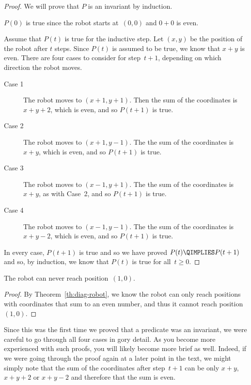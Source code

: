 \begin{proof}
We will prove that $P$ is an invariant by induction.

$P(0)$ is true since the robot starts at~$(0, 0)$ and $0 + 0$ is even.

Assume that $P(t)$ is true for the inductive step.  Let $(x, y)$ be
the position of the robot after $t$ steps.  Since $P(t)$ is assumed to
be true, we know that $x + y$ is even.  There are four cases to
consider for step~$t + 1$, depending on which direction the robot
moves.
\begin{description}

\item[Case 1]
The robot moves to $(x + 1, y + 1)$.  Then the sum of the coordinates
is $x + y + 2$, which is even, and so $P(t+1)$ is true.

\item[Case 2]
The robot moves to $(x + 1, y - 1)$.  The the sum of the coordinates
is $x + y$, which is even, and so $P(t + 1)$ is true.

\item[Case 3]
The robot moves to $(x - 1, y + 1)$.  The the sum of the coordinates
is $x + y$, as with Case~2, and so $P(t + 1)$ is true.

\item[Case 4]
The robot moves to $(x - 1, y - 1)$.  The the sum of the coordinates
is $x + y - 2$, which is even, and so $P(t + 1)$ is true.

\end{description}
In every case, $P(t + 1)$ is true and so we have proved $P(t)
\QIMPLIES P(t + 1)$ and so, by induction, we know that $P(t)$ is true
for all~$t \ge 0$.
\end{proof}

\begin{corollary}\label{cor:diag-robot}
The robot can never reach position~$(1, 0)$.
\end{corollary}

\begin{proof}
By Theorem~\ref{th:diag-robot}, we know the robot can only reach
positions with coordinates that sum to an even number, and thus it
cannot reach position~$(1, 0)$.
\end{proof}

Since this was the first time we proved that a predicate was an
invariant, we were careful to go through all four cases in gory
detail.  As you become more experienced with such proofs, you will
likely become more brief as well.  Indeed, if we were going through
the proof again at a later point in the text, we might simply note
that the sum of the coordinates after step~$t + 1$ can be only $x +
y$, $x + y + 2$ or $x + y - 2$ and therefore that the sum is even.

